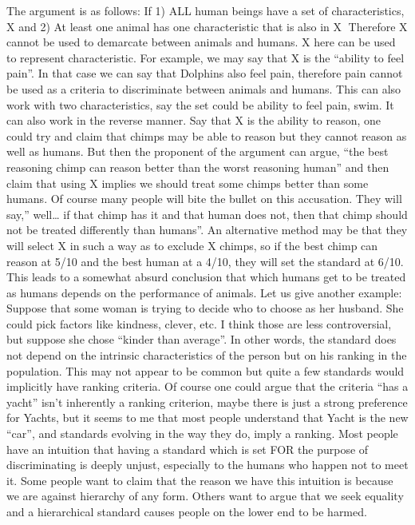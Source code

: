 The argument is as follows: If
1) ALL human beings have a set of characteristics, X and
2) At least one animal has one characteristic that is also in X
Therefore X cannot be used to demarcate between animals and humans.
X here can be used to represent characteristic. For example, we may say that X is the “ability to feel pain”. In that case we can say that Dolphins also feel pain, therefore pain cannot be used as a criteria to discriminate between animals and humans. This can also work with two characteristics, say the set could be {ability to feel pain, swim}. 
It can also work in the reverse manner. Say that X is the ability to reason, one could try and claim that chimps may be able to reason but they cannot reason as well as humans. But then the proponent of the argument can argue,  “the best reasoning chimp can reason better than the worst reasoning human” and then claim that using X implies we should treat some chimps better than some humans. 
Of course many people will bite the bullet on this accusation. They will say,” well… if that chimp has it and that human does not, then that chimp should not be treated differently than humans”. An alternative method may be that they will select X in such a way as to exclude X chimps, so if the best chimp can reason at 5/10 and the best human at a 4/10, they will set the standard at 6/10. This leads to a somewhat absurd conclusion that which humans get to be treated as humans depends on the performance of animals. 
Let us give another example: Suppose that some woman is trying to decide who to choose as her husband. She could pick factors like kindness, clever, etc. I think those are less controversial, but suppose she chose “kinder than average”. In other words, the standard does not depend on the intrinsic characteristics of the person but on his ranking in the population. 
This may not appear to be common but quite a few standards would implicitly have ranking criteria. Of course one could argue that the criteria “has a yacht” isn’t inherently a ranking criterion, maybe there is just a strong preference for Yachts, but it seems to me that most people understand that Yacht is the new “car”, and standards evolving in the way they do, imply a ranking. 
Most people have an intuition that having a standard which is set FOR the purpose of discriminating is deeply unjust, especially to the humans who happen not to meet it. Some people want to claim that the reason we have this intuition is because we are against hierarchy of any form. Others want to argue that we seek equality and a hierarchical standard causes people on the lower end to be harmed. 
